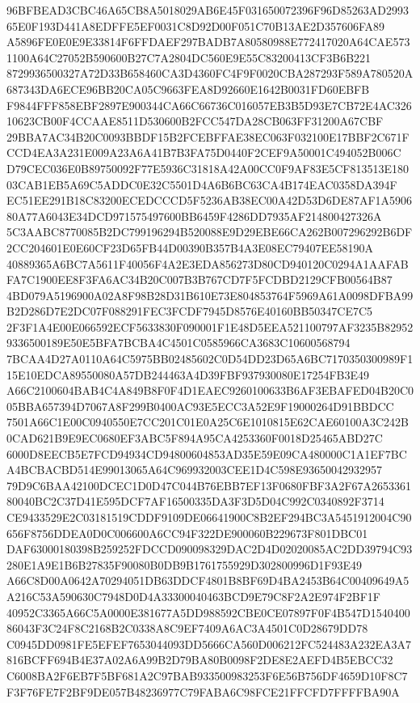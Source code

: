 \documentclass[UTF8,fontset=fandol,zihao=-4,a4paper]{ctexart}
\begin{document}
{{96BFBEAD3CBC46A65CB8A5018029AB6E45F031650072396F96D85263AD299365E0F193D441A8EDFFE5EF0031C8D92D00F051C70B13AE2D357606FA89
A5896FE0E0E9E33814F6FFDAEF297BADB7A80580988E772417020A64CAE5731100A64C27052B590600B27C7A2804DC560E9E55C83200413CF3B6B221
8729936500327A72D33B658460CA3D4360FC4F9F0020CBA287293F589A780520A687343DA6ECE96BB20CA05C9663FEA8D92660E1642B0031FD60EBFB
F9844FFF858EBF2897E900344CA66C66736C016057EB3B5D93E7CB72E4AC32610623CB00F4CCAAE8511D530600B2FCC547DA28CB063FF31200A67CBF
29BBA7AC34B20C0093BBDF15B2FCEBFFAE38EC063F032100E17BBF2C671FCCD4EA3A231E009A23A6A41B7B3FA75D0440F2CEF9A50001C494052B006C
D79CEC036E0B89750092F77E5936C31818A42A00CC0F9AF83E5CF813513E18003CAB1EB5A69C5ADDC0E32C5501D4A6B6BC63CA4B174EAC0358DA394F
EC51EE291B18C83200ECEDCCCD5F5236AB38EC00A42D53D6DE87AF1A590680A77A6043E34DCD971575497600BB6459F4286DD7935AF214800427326A
5C3AABC8770085B2DC799196294B520088E9D29EBE66CA262B007296292B6DF2CC204601E0E60CF23D65FB44D00390B357B4A3E08EC79407EE58190A
40889365A6BC7A5611F40056F4A2E3EDA856273D80CD940120C0294A1AAFABFA7C1900EE8F3FA6AC34B20C007B3B767CD7F5FCDBD2129CFB00564B87
4BD079A5196900A02A8F98B28D31B610E73E804853764F5969A61A0098DFBA99B2D286D7E2DC07F088291FEC3FCDF7945D8576E40160BB50347CE7C5
2F3F1A4E00E066592ECF5633830F090001F1E48D5EEA521100797AF3235B829529336500189E50E5BFA7BCBA4C4501C0585966CA3683C10600568794
7BCAA4D27A0110A64C5975BB02485602C0D54DD23D65A6BC7170350300989F115E10EDCA89550080A57DB244463A4D39FBF937930080E17254FB3E49
A66C2100604BAB4C4A849B8F0F4D1EAEC9260100633B6AF3EBAFED04B20C005BBA657394D7067A8F299B0400AC93E5ECC3A52E9F19000264D91BBDCC
7501A66C1E00C0940550E7CC201C01E0A25C6E1010815E62CAE60100A3C242B0CAD621B9E9EC0680EF3ABC5F894A95CA4253360F0018D25465ABD27C
6000D8EECB5E7FCD94934CD94800604853AD35E59E09CA480000C1A1EF7BCA4BCBACBD514E99013065A64C969932003CEE1D4C598E93650042932957
79D9C6BAA42100DCEC1D0D47C044B76EBB7EF13F0680FBF3A2F67A265336180040BC2C37D41E595DCF7AF16500335DA3F3D5D04C992C0340892F3714
CE9433529E2C03181519CDDF9109DE06641900C8B2EF294BC3A5451912004C90656F8756DDEA0D0C006600A6CC94F322DE900060B229673F801DBC01
DAF63000180398B259252FDCCD090098329DAC2D4D02020085AC2DD39794C93280E1A9E1B6B27835F90080B0DB9B1761755929D302800996D1F93E49
A66C8D00A0642A70294051DB63DDCF4801B8BF69D4BA2453B64C00409649A5A216C53A590630C7948D0D4A33300040463BCD9E79C8F2A2E974F2BF1F
40952C3365A66C5A0000E381677A5DD988592CBE0CE07897F0F4B547D154040086043F3C24F8C2168B2C0338A8C9EF7409A6AC3A4501C0D28679DD78
C0945DD0981FE5EFEF7653044093DD5666CA560D006212FC524483A232EA3A7816BCFF694B4E37A02A6A99B2D79BA80B0098F2DE8E2AEFD4B5EBCC32
C6008BA2F6EB7F5BF681A2C97BAB933500983253F6E56B756DF4659D10F8C7F3F76FE7F2BF9DE057B48236977C79FABA6C98FCE21FFCFD7FFFFBA90A
}}
\end{document}
